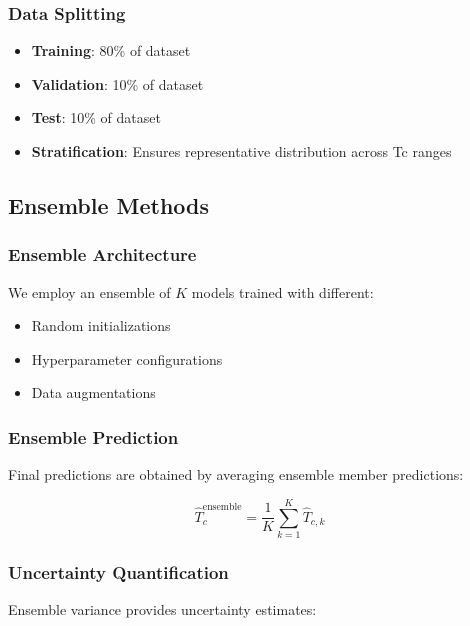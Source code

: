 \documentclass[11pt,a4paper]{article}
\begin{document}
\subsubsection{Data Splitting}

\begin{itemize}
    \item \textbf{Training}: 80\% of dataset
    \item \textbf{Validation}: 10\% of dataset
    \item \textbf{Test}: 10\% of dataset
    \item \textbf{Stratification}: Ensures representative distribution across Tc ranges
\end{itemize}

\subsection{Ensemble Methods}

\subsubsection{Ensemble Architecture}

We employ an ensemble of $K$ models trained with different:

\begin{itemize}
    \item Random initializations
    \item Hyperparameter configurations
    \item Data augmentations
\end{itemize}

\subsubsection{Ensemble Prediction}

Final predictions are obtained by averaging ensemble member predictions:

\begin{equation}
\hat{T}_c^{\text{ensemble}} = \frac{1}{K}\sum_{k=1}^{K}\hat{T}_{c,k}
\end{equation}

\subsubsection{Uncertainty Quantification}

Ensemble variance provides uncertainty estimates:
\end{document}
